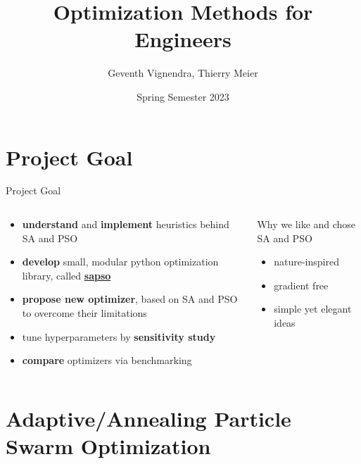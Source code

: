 \documentclass[11pt,aspectratio=169]{beamer}
\title{Optimization Methods for Engineers}
\date[July 2023]{Spring Semester 2023}
\author{Geventh Vignendra, Thierry Meier}
\institute{Optimization Methods for Engineers\\227-0707-00L}
\begin{document}
\def\titlefigure{elements/eggholder.pdf}        %

%
%

\titleframe

%
%

\tocframe

%
%

\section{Project Goal}

%
%

\begin{frame}[fragile]{Project Goal}
    \begin{columns}
    \begin{column}{0.5\textwidth}


        \begin{itemize}
            \item \textbf{understand} and \textbf{implement} heuristics behind SA and PSO
            \item \textbf{develop} small, modular python optimization library, called \href{https://github.com/thmeier}{\textbf{sapso}}
            \item \textbf{propose new optimizer}, based on SA and PSO to overcome their limitations
            \item tune hyperparameters by \textbf{sensitivity study}
            \item \textbf{compare} optimizers via benchmarking
        \end{itemize}

    \end{column}
    \begin{column}{0.5\textwidth}
        Why we like and chose SA and PSO
        \begin{itemize}
            \item nature-inspired
            \item gradient free
            \item simple yet elegant ideas
        \end{itemize}
    \end{column}
    \end{columns}
\end{frame}

%
%

\section{Adaptive/Annealing Particle Swarm Optimization}
\end{document}
